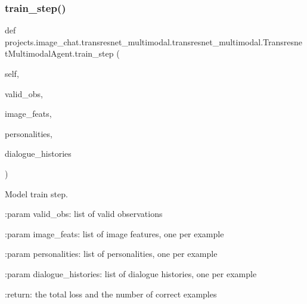 \subsubsection{\texorpdfstring{train\+\_\+step()}{train\_step()}}
{\footnotesize\ttfamily def projects.\+image\+\_\+chat.\+transresnet\+\_\+multimodal.\+transresnet\+\_\+multimodal.\+Transresnet\+Multimodal\+Agent.\+train\+\_\+step (\begin{DoxyParamCaption}\item[{}]{self,  }\item[{}]{valid\+\_\+obs,  }\item[{}]{image\+\_\+feats,  }\item[{}]{personalities,  }\item[{}]{dialogue\+\_\+histories }\end{DoxyParamCaption})}

\begin{DoxyVerb}Model train step.

:param valid_obs:
    list of valid observations

:param image_feats:
    list of image features, one per example

:param personalities:
    list of personalities, one per example

:param dialogue_histories:
    list of dialogue histories, one per example

:return:
    the total loss and the number of correct examples
\end{DoxyVerb}
 \mbox{\label{classprojects_1_1image__chat_1_1transresnet__multimodal_1_1transresnet__multimodal_1_1TransresnetMultimodalAgent_a57fb284e1f2308c4524c72af053c9397}} 
